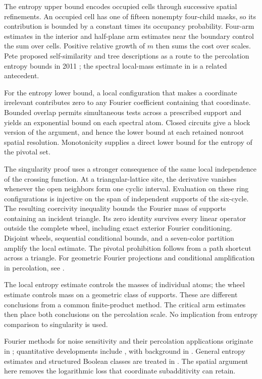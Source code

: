 \documentclass[11pt]{amsart}
\theoremstyle{remark}
\begin{document}
The entropy upper bound encodes occupied cells through successive spatial refinements. An occupied cell has one of fifteen nonempty four-child masks, so its contribution is bounded by a constant times its occupancy probability. Four-arm estimates in the interior and half-plane arm estimates near the boundary control the sum over cells. Positive relative growth of $m$ then sums the cost over scales. Pete proposed self-similarity and tree descriptions as a route to the percolation entropy bounds in 2011 \cite[slides~21--22]{Pete}; the spectral local-mass estimate in \cite[Lemma~3.2 and equation~(3.7)]{GPS} is a related antecedent.

For the entropy lower bound, a local configuration that makes a coordinate irrelevant contributes zero to any Fourier coefficient containing that coordinate. Bounded overlap permits simultaneous tests across a prescribed support and yields an exponential bound on each spectral atom. Closed circuits give a block version of the argument, and hence the lower bound at each retained nonroot spatial resolution. Monotonicity supplies a direct lower bound for the entropy of the pivotal set.

The singularity proof uses a stronger consequence of the same local independence of the crossing function. At a triangular-lattice site, the derivative vanishes whenever the open neighbors form one cyclic interval. Evaluation on these ring configurations is injective on the span of independent supports of the six-cycle. The resulting coercivity inequality bounds the Fourier mass of supports containing an incident triangle. Its zero identity survives every linear operator outside the complete wheel, including exact exterior Fourier conditioning. Disjoint wheels, sequential conditional bounds, and a seven-color partition amplify the local estimate. The pivotal prohibition follows from a path shortcut across a triangle. For geometric Fourier projections and conditional amplification in percolation, see \cite[Lemma~4.3 and Propositions~5.1 and~6.1]{GPS}.

The local entropy estimate controls the masses of individual atoms; the wheel estimate controls mass on a geometric class of supports. These are different conclusions from a common finite-product method. The critical arm estimates then place both conclusions on the percolation scale. No implication from entropy comparison to singularity is used.

Fourier methods for noise sensitivity and their percolation applications originate in \cite{BKS}; quantitative developments include \cite{SS,GPS,TV}, with background in \cite{GS}. General entropy estimates and structured Boolean classes are treated in \cite{KMS,KKLMS,Han,OWZ,OT,CKLS,WWW,GMP}. The spatial argument here removes the logarithmic loss that coordinate subadditivity can retain.
\end{document}
